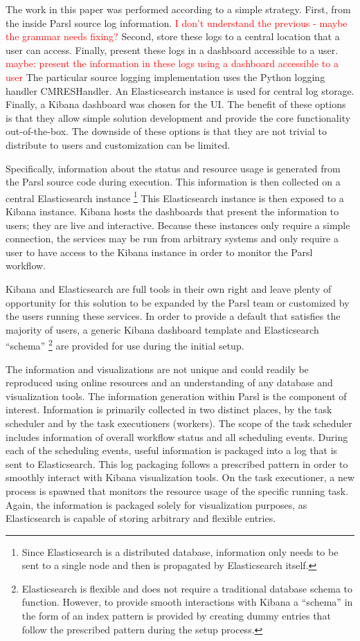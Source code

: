 The work in this paper was performed according to a simple strategy.
First, from the inside Parsl source log information. \textcolor{red}{I don't understand the previous - maybe the grammar needs fixing?}
Second, store these logs to a central location that a user can access.
Finally, present these logs in a dashboard accessible to a user. \textcolor{red}{maybe: present the information in these logs using a dashboard accessible to a user}
The particular source logging implementation uses the Python logging handler CMRESHandler.
An Elasticsearch instance is used for central log storage.
Finally, a Kibana dashboard was chosen for the UI.
The benefit of these options is that they allow simple solution development and provide the core functionality out-of-the-box.
The downside of these options is that they are not trivial to distribute to users and customization can be limited.

Specifically, information about the status and resource usage is generated from the Parsl source code during execution.
This information is then collected on a central Elasticsearch instance \footnote{Since Elasticsearch is a distributed database, information only needs to be sent to a single node and then is propagated by Elasticsearch itself.}
This Elasticsearch instance is then exposed to a Kibana instance.
Kibana hosts the dashboards that present the information to users; they are live and interactive.
Because these instances only require a simple connection, the services may be run from arbitrary systems and only require a user to have access to the Kibana instance in order to monitor the Parsl workflow.

Kibana and Elasticsearch are full tools in their own right and leave plenty of opportunity for this solution to be expanded by the Parsl team or customized by the users running these services.
In order to provide a default that satisfies the majority of users, a generic Kibana dashboard template and Elasticsearch ``schema'' \footnote{Elasticsearch is flexible and does not require a traditional database schema to function. However, to provide smooth interactions with Kibana a ``schema'' in the form of an index pattern is provided by creating dummy entries that follow the prescribed pattern during the setup process.} are provided for use during the initial setup.

The information and visualizations are not unique and could readily be reproduced using online resources and an understanding of any database and visualization tools.
The information generation within Parsl is the component of interest.
Information is primarily collected in two distinct places, by the task scheduler and by the task executioners (workers).
The scope of the task scheduler includes information of overall workflow status and all scheduling events. During each of the scheduling events, useful information is packaged into a log that is sent to Elasticsearch.
This log packaging follows a prescribed pattern in order to smoothly interact with Kibana visualization tools.
On the task executioner, a new process is spawned that monitors the resource usage of the specific running task.
Again, the information is packaged solely for visualization purposes, as Elasticsearch is capable of storing arbitrary and flexible entries.

